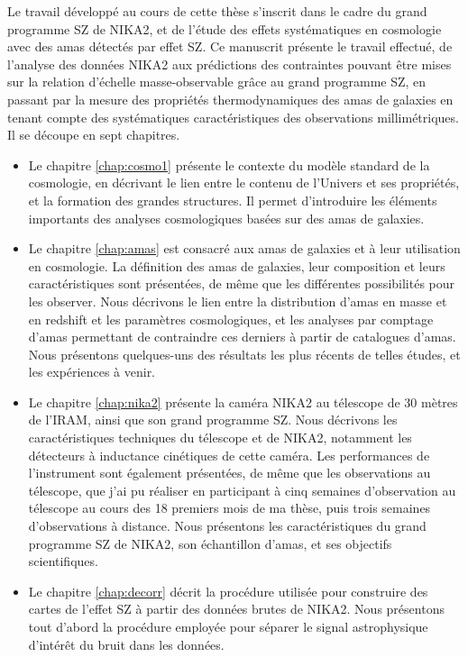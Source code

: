 Le travail développé au cours de cette thèse s'inscrit dans le cadre du grand programme SZ de NIKA2, et de l'étude des effets systématiques en cosmologie avec des amas détectés par effet SZ.
Ce manuscrit présente le travail effectué, de l'analyse des données NIKA2 aux prédictions des contraintes pouvant être mises sur la relation d'échelle masse-observable grâce au grand programme SZ, en passant par la mesure des propriétés thermodynamiques des amas de galaxies en tenant compte des systématiques caractéristiques des observations millimétriques.
Il se découpe en sept chapitres.
\begin{itemize}[leftmargin=*]
\setlength\itemsep{5pt}
\item
    Le chapitre \ref{chap:cosmo1} présente le contexte du modèle standard de la cosmologie, en décrivant le lien entre le contenu de l'Univers et ses propriétés, et la formation des grandes structures.
    Il permet d'introduire les éléments importants des analyses cosmologiques basées sur des amas de galaxies.
\item
    Le chapitre \ref{chap:amas} est consacré aux amas de galaxies et à leur utilisation en cosmologie.
    La définition des amas de galaxies, leur composition et leurs caractéristiques sont présentées, de même que les différentes possibilités pour les observer.
   Nous décrivons le lien entre la distribution d'amas en masse et en redshift et les paramètres cosmologiques, et les analyses par comptage d'amas permettant de contraindre ces derniers à partir de catalogues d'amas.
   Nous présentons quelques-uns des résultats les plus récents de telles études, et les expériences à venir.
\item
    Le chapitre \ref{chap:nika2} présente la caméra NIKA2 au télescope de 30 mètres de l'IRAM, ainsi que son grand programme SZ.
    Nous décrivons les caractéristiques techniques du télescope et de NIKA2, notamment les détecteurs à inductance cinétiques de cette caméra.
    Les performances de l'instrument sont également présentées, de même que les observations au télescope, que j'ai pu réaliser en participant à cinq semaines d'observation au télescope au cours des 18 premiers mois de ma thèse, puis trois semaines d'observations à distance.
    Nous présentons les caractéristiques du grand programme SZ de NIKA2, son échantillon d'amas, et ses objectifs scientifiques.
\item
    Le chapitre \ref{chap:decorr} décrit la procédure utilisée pour construire des cartes de l'effet SZ à partir des données brutes de NIKA2.
    Nous présentons tout d'abord la procédure employée pour séparer le signal astrophysique d'intérêt du bruit dans les données.

\end{itemize}

